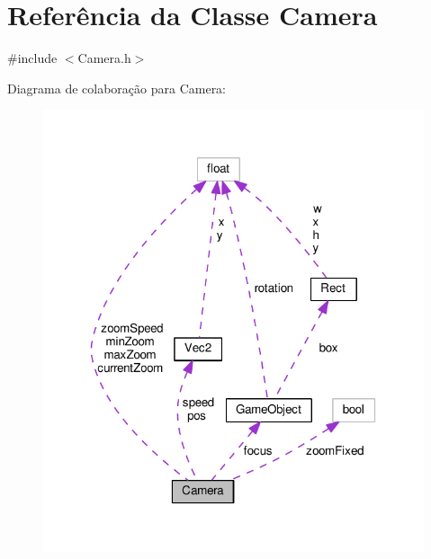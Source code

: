 \hypertarget{classCamera}{\section{Referência da Classe Camera}
\label{classCamera}
}


{\ttfamily \#include $<$Camera.\+h$>$}



Diagrama de colaboração para Camera\+:\nopagebreak
\begin{figure}[H]
\begin{center}
\leavevmode
\includegraphics[width=317pt]{classCamera__coll__graph}
\end{center}
\end{figure}
